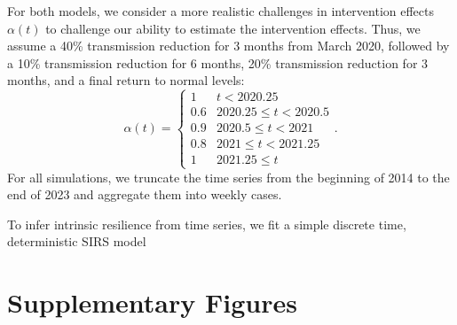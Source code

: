 \documentclass[12pt]{article}
\begin{document}
For both models, we consider a more realistic challenges in intervention effects $\alpha(t)$ to challenge our ability to estimate the intervention effects.
Thus, we assume a 40\% transmission reduction for 3 months from March 2020, followed by a 10\% transmission reduction for 6 months, 20\% transmission reduction for 3 months, and a final return to normal levels:
\begin{equation}
\alpha(t) = \begin{cases}
1 & t < 2020.25\\
0.6 & 2020.25 \leq t < 2020.5\\
0.9 & 2020.5 \leq t < 2021\\
0.8 & 2021 \leq t < 2021.25\\
1 & 2021.25 \leq t
\end{cases}.
\end{equation}
For all simulations, we truncate the time series from the beginning of 2014 to the end of 2023 and aggregate them into weekly cases.

To infer intrinsic resilience from time series, we fit a simple discrete time, deterministic SIRS model

\pagebreak

\section*{Supplementary Figures}
\end{document}
